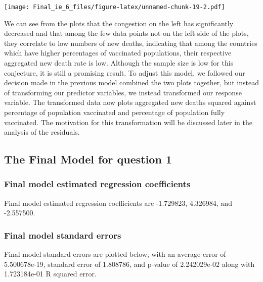 \documentclass[
  12pt,
]{article}
\begin{document}
\texttt{[image: Final\_ie\_6\_files/figure-latex/unnamed-chunk-19-2.pdf]}

We can see from the plots that the congestion on the left has
significantly decreased and that among the few data points not on the
left side of the plots, they correlate to low numbers of new deaths,
indicating that among the countries which have higher percentages of
vaccinated populations, their respective aggregated new death rate is
low. Although the sample size is low for this conjecture, it is still a
promising result. To adjust this model, we followed our decision made in
the previous model combined the two plots together, but instead of
transforming our predictor variables, we instead transformed our
response variable. The transformed data now plots aggregated new deaths
squared against percentage of population vaccinated and percentage of
population fully vaccinated. The motivation for this transformation will
be discussed later in the analysis of the residuals.

\hypertarget{the-final-model-for-question-1}{%
\subsection{The Final Model for question
1}\label{the-final-model-for-question-1}}

\hypertarget{final-model-estimated-regression-coefficients}{%
\subsubsection{Final model estimated regression
coefficients}\label{final-model-estimated-regression-coefficients}}

Final model estimated regression coefficients are -1.729823, 4.326984,
and -2.557500.

\hypertarget{final-model-standard-errors}{%
\subsubsection{Final model standard
errors}\label{final-model-standard-errors}}

Final model standard errors are plotted below, with an average error of
5.500678e-19, standard error of 1.808786, and p-value of 2.242029e-02
along with 1.723184e-01 R squared error.
\end{document}
